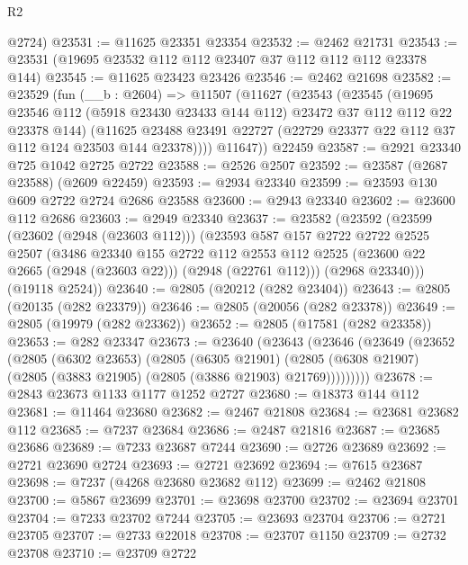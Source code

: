 \begin{lexlean}{R2}
\begin{coremodule}
      @2724)
@23531 := @11625 @23351 @23354
@23532 := @2462 @21731
@23543 := @23531 (@19695 @23532 @112 @112 @23407 @37 @112 @112 @112 @23378 @144)
@23545 := @11625 @23423 @23426
@23546 := @2462 @21698
@23582 := @23529
    (fun (__b : @2604) =>
    @11507
      (@11627
        (@23543
          (@23545
            (@19695
              @23546
              @112
              (@5918 @23430 @23433 @144 @112)
              @23472
              @37
              @112
              @112
              @22
              @23378
              @144)
            (@11625
              @23488
              @23491
              @22727
              (@22729 @23377 @22 @112 @37 @112 @124 @23503 @144 @23378))))
        @11647))
    @22459
@23587 := @2921 @23340 @725 @1042 @2725 @2722
@23588 := @2526 @2507
@23592 := @23587 (@2687 @23588) (@2609 @22459)
@23593 := @2934 @23340
@23599 := @23593 @130 @609 @2722 @2724 @2686 @23588
@23600 := @2943 @23340
@23602 := @23600 @112 @2686
@23603 := @2949 @23340
@23637 := @23582
    (@23592
      (@23599
        (@23602 (@2948 (@23603 @112)))
        (@23593
          @587
          @157
          @2722
          @2722
          @2525
          @2507
          (@3486
            @23340
            @155
            @2722
            @112
            @2553
            @112
            @2525
            (@23600 @22 @2665 (@2948 (@23603 @22)))
            (@2948 (@22761 @112)))
          (@2968 @23340)))
      (@19118 @2524))
@23640 := @2805 (@20212 (@282 @23404))
@23643 := @2805 (@20135 (@282 @23379))
@23646 := @2805 (@20056 (@282 @23378))
@23649 := @2805 (@19979 (@282 @23362))
@23652 := @2805 (@17581 (@282 @23358))
@23653 := @282 @23347
@23673 := @23640
    (@23643
      (@23646
        (@23649
          (@23652
            (@2805
              (@6302 @23653)
              (@2805
                (@6305 @21901)
                (@2805 (@6308 @21907) (@2805 (@3883 @21905) (@2805 (@3886 @21903) @21769)))))))))
@23678 := @2843 @23673 @1133 @1177 @1252 @2727
@23680 := @18373 @144 @112
@23681 := @11464 @23680
@23682 := @2467 @21808
@23684 := @23681 @23682 @112
@23685 := @7237 @23684
@23686 := @2487 @21816
@23687 := @23685 @23686
@23689 := @7233 @23687 @7244
@23690 := @2726 @23689
@23692 := @2721 @23690 @2724
@23693 := @2721 @23692
@23694 := @7615 @23687
@23698 := @7237 (@4268 @23680 @23682 @112)
@23699 := @2462 @21808
@23700 := @5867 @23699
@23701 := @23698 @23700
@23702 := @23694 @23701
@23704 := @7233 @23702 @7244
@23705 := @23693 @23704
@23706 := @2721 @23705
@23707 := @2733 @22018
@23708 := @23707 @1150
@23709 := @2732 @23708
@23710 := @23709 @2722

\end{coremodule}
\end{lexlean}
